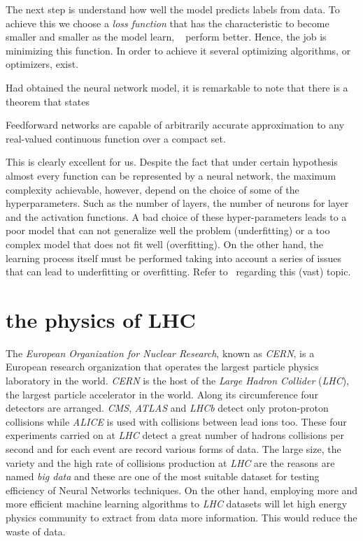 The next step is understand how well the model predicts labels from data.
To achieve this we choose a \textit{loss function} that has the
characteristic to become smaller and smaller as the model learn, \eg~
perform better. Hence, the job is minimizing this function. In order to achieve
it several optimizing algorithms, or optimizers, exist.

Had obtained the neural network model, it is remarkable to note that there
is a theorem that states~\cite{theorem}
\begin{teorema}
 Feedforward networks are capable of arbitrarily accurate approximation
 to any real-valued continuous function over a compact set.
\end{teorema}

This is clearly excellent for us. Despite the fact that under certain
hypothesis almost every function can be represented by a neural network,
the maximum complexity achievable, however, depend on the choice of some of the
hyperparameters. Such as the number of layers, the number of neurons
for layer and the activation functions. A bad choice of these
hyper-parameters leads to a poor model that can not generalize well the problem
(underfitting) or a too complex model that does not fit well (overfitting).
On the other hand, the learning process itself must be
performed taking into account a series of issues that can lead to
underfitting or overfitting. Refer to~\cite{deeplearningbook} regarding
this (vast) topic.

\section{the physics of LHC}

The \textit{European Organization for Nuclear Research}, known as
\textit{CERN}, is a European research organization that operates the
largest particle physics laboratory in the world. \textit{CERN} is the
host of the \textit{Large Hadron Collider} (\textit{LHC}), the largest
particle accelerator in the world. Along its circumference four detectors
are arranged. \textit{CMS}, \textit{ATLAS} and \textit{LHCb} detect only
proton-proton collisions while \textit{ALICE} is used with collisions
between lead ions too. These four experiments carried on at \textit{LHC}
detect a great number of hadrons collisions per second and for each event
are record various forms of data. The large size, the variety and the high
rate of collisions production at \textit{LHC} are the reasons are named
\textit{big data} and these are one of the most suitable dataset for
testing efficiency of Neural Networks techniques. On the other hand,
employing more and more efficient machine learning algorithms to
\textit{LHC} datasets will let high energy physics community to extract
from data more information. This would reduce the waste of data.

